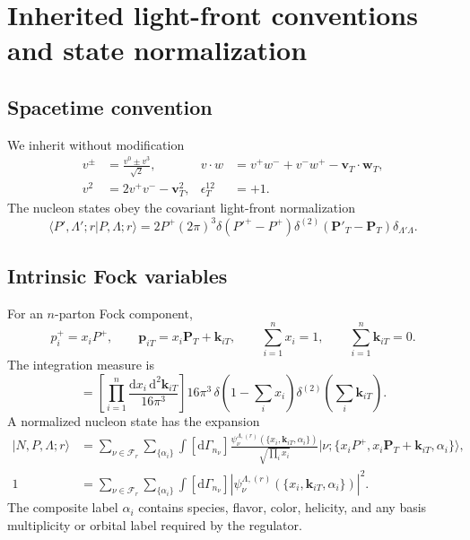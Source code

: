 \documentclass[11pt]{article}
\newcommand{\kiT}{\bm{k}_{iT}}
\newcommand{\PT}{\bm{P}_{T}}
\newcommand{\dd}{\mathrm{d}}
\newcommand{\cF}{\mathcal F}
\begin{document}
\section{Inherited light-front conventions and state normalization}
\label{sec:inherited}

\subsection{Spacetime convention}

We inherit without modification
\begin{align}
 v^\pm&=\frac{v^0\pm v^3}{\sqrt2},
 &v\cdot w&=v^+w^-+v^-w^+-\bm v_T\cdot\bm w_T,
\label{eq:lf-convention}\\
 v^2&=2v^+v^- -\bm v_T^2,
 &\epsilon_T^{12}&=+1.
\label{eq:lf-invariant}
\end{align}
The nucleon states obey the covariant light-front normalization
\begin{equation}
 \langle P',\Lambda';r|P,\Lambda;r\rangle
 =2P^+(2\pi)^3\delta(P'^+-P^+)
 \delta^{(2)}(\bm P'_T-\bm P_T)\delta_{\Lambda'\Lambda}.
\label{eq:hadron-normalization}
\end{equation}

\subsection{Intrinsic Fock variables}

For an \(n\)-parton Fock component,
\begin{equation}
 p_i^+=x_iP^+,
 \qquad
 \bm p_{iT}=x_i\bm P_T+\kiT,
 \qquad
 \sum_{i=1}^n x_i=1,
 \qquad
 \sum_{i=1}^n\kiT=0.
\label{eq:intrinsic-definition}
\end{equation}
The integration measure is
\begin{equation}
 [\dd\Gamma_n]
 =\left[\prod_{i=1}^n
 \frac{\dd x_i\,\dd^2\kiT}{16\pi^3}\right]
 16\pi^3\,
 \delta\!\left(1-\sum_i x_i\right)
 \delta^{(2)}\!\left(\sum_i\kiT\right).
\label{eq:fock-measure}
\end{equation}
A normalized nucleon state has the expansion
\begin{align}
 |N,P,\Lambda;r\rangle
 &=\sum_{\nu\in\cF_r}
 \sum_{\{\alpha_i\}}
 \int[\dd\Gamma_{n_\nu}]
 \frac{\psi^{\Lambda,(r)}_{\nu}
       (\{x_i,\kiT,\alpha_i\})}
      {\sqrt{\prod_i x_i}}
 |\nu;\{x_iP^+,x_i\PT+\kiT,\alpha_i\}\rangle,
\label{eq:nucleon-fock-expansion}\\
 1&=\sum_{\nu\in\cF_r}\sum_{\{\alpha_i\}}
 \int[\dd\Gamma_{n_\nu}]
 \left|\psi^{\Lambda,(r)}_\nu
 (\{x_i,\kiT,\alpha_i\})\right|^2.
\label{eq:fock-normalization}
\end{align}
The composite label \(\alpha_i\) contains species, flavor, color, helicity,
and any basis multiplicity or orbital label required by the regulator.
\end{document}
